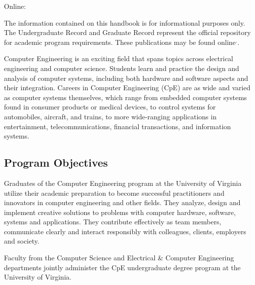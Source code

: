 \noindent Online: \bscpeURL


The information contained on this handbook is for informational
purposes only. The Undergraduate Record and Graduate Record represent
the official repository for academic program requirements. These
publications may be found online$^,$.



Computer Engineering is an exciting field that spans topics across
electrical engineering and computer science.  Students learn and
practice the design and analysis of computer systems, including both
hardware and software aspects and their integration. Careers in
Computer Engineering (CpE) are as wide and varied as computer systems
themselves, which range from embedded computer systems found in
consumer products or medical devices, to control systems for
automobiles, aircraft, and trains, to more wide-ranging applications
in entertainment, telecommunications, financial transactions, and
information systems.


\subsection{Program Objectives}

Graduates of the Computer Engineering program at the
University of Virginia utilize their academic preparation
to become successful practitioners and innovators in
computer engineering and other fields. They analyze,
design and implement creative solutions to problems
with computer hardware, software, systems and
applications. They contribute effectively as team
members, communicate clearly and interact responsibly
with colleagues, clients, employers and society.

Faculty from the Computer Science and Electrical \& Computer
Engineering departments jointly administer the CpE undergraduate
degree program at the University of Virginia.

